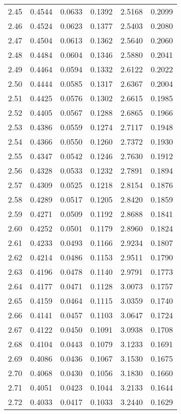 \documentclass{article}
\begin{document}
\begin{longtable}{cccccc}
2.45 & 0.4544 & 0.0633 & 0.1392 & 2.5168 & 0.2099 \\
2.46 & 0.4524 & 0.0623 & 0.1377 & 2.5403 & 0.2080 \\
2.47 & 0.4504 & 0.0613 & 0.1362 & 2.5640 & 0.2060 \\
2.48 & 0.4484 & 0.0604 & 0.1346 & 2.5880 & 0.2041 \\
2.49 & 0.4464 & 0.0594 & 0.1332 & 2.6122 & 0.2022 \\
2.50 & 0.4444 & 0.0585 & 0.1317 & 2.6367 & 0.2004 \\
2.51 & 0.4425 & 0.0576 & 0.1302 & 2.6615 & 0.1985 \\
2.52 & 0.4405 & 0.0567 & 0.1288 & 2.6865 & 0.1966 \\
2.53 & 0.4386 & 0.0559 & 0.1274 & 2.7117 & 0.1948 \\
2.54 & 0.4366 & 0.0550 & 0.1260 & 2.7372 & 0.1930 \\
2.55 & 0.4347 & 0.0542 & 0.1246 & 2.7630 & 0.1912 \\
2.56 & 0.4328 & 0.0533 & 0.1232 & 2.7891 & 0.1894 \\
2.57 & 0.4309 & 0.0525 & 0.1218 & 2.8154 & 0.1876 \\
2.58 & 0.4289 & 0.0517 & 0.1205 & 2.8420 & 0.1859 \\
2.59 & 0.4271 & 0.0509 & 0.1192 & 2.8688 & 0.1841 \\
2.60 & 0.4252 & 0.0501 & 0.1179 & 2.8960 & 0.1824 \\
2.61 & 0.4233 & 0.0493 & 0.1166 & 2.9234 & 0.1807 \\
2.62 & 0.4214 & 0.0486 & 0.1153 & 2.9511 & 0.1790 \\
2.63 & 0.4196 & 0.0478 & 0.1140 & 2.9791 & 0.1773 \\
2.64 & 0.4177 & 0.0471 & 0.1128 & 3.0073 & 0.1757 \\
2.65 & 0.4159 & 0.0464 & 0.1115 & 3.0359 & 0.1740 \\
2.66 & 0.4141 & 0.0457 & 0.1103 & 3.0647 & 0.1724 \\
2.67 & 0.4122 & 0.0450 & 0.1091 & 3.0938 & 0.1708 \\
2.68 & 0.4104 & 0.0443 & 0.1079 & 3.1233 & 0.1691 \\
2.69 & 0.4086 & 0.0436 & 0.1067 & 3.1530 & 0.1675 \\
2.70 & 0.4068 & 0.0430 & 0.1056 & 3.1830 & 0.1660 \\
2.71 & 0.4051 & 0.0423 & 0.1044 & 3.2133 & 0.1644 \\
2.72 & 0.4033 & 0.0417 & 0.1033 & 3.2440 & 0.1629 \\

\end{longtable}
\end{document}
